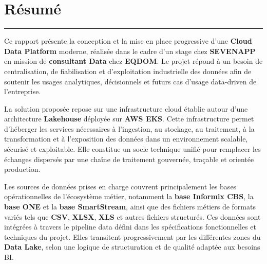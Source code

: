 \chapter*{Résumé}

\begin{center}
{\color{softline}\rule{0.42\textwidth}{0.7pt}}
\end{center}

\vspace{0.18cm}



\begingroup
\enlargethispage{2\baselineskip}
\small
\setlength{\parindent}{0pt}
\setlength{\parskip}{0.42em}
\linespread{1.0}\selectfont
Ce rapport présente la conception et la mise en place progressive d'une \textbf{Cloud Data Platform} moderne, réalisée dans le cadre d'un stage chez \textbf{SEVENAPP} en mission de \textbf{consultant Data} chez \textbf{EQDOM}. Le projet répond à un besoin de centralisation, de fiabilisation et d'exploitation industrielle des données afin de soutenir les usages analytiques, décisionnels et futurs cas d'usage data-driven de l'entreprise.

La solution proposée repose sur une infrastructure cloud établie autour d'une architecture \textbf{Lakehouse} déployée sur \textbf{AWS EKS}. Cette infrastructure permet d'héberger les services nécessaires à l'ingestion, au stockage, au traitement, à la transformation et à l'exposition des données dans un environnement scalable, sécurisé et exploitable. Elle constitue un socle technique unifié pour remplacer les échanges dispersés par une chaîne de traitement gouvernée, traçable et orientée production.

Les sources de données prises en charge couvrent principalement les bases opérationnelles de l'écosystème métier, notamment la \textbf{base Informix CBS}, la \textbf{base ONE} et la \textbf{base SmartStream}, ainsi que des fichiers métiers de formats variés tels que \textbf{CSV}, \textbf{XLSX}, \textbf{XLS} et autres fichiers structurés. Ces données sont intégrées à travers le pipeline data défini dans les spécifications fonctionnelles et techniques du projet. Elles transitent progressivement par les différentes zones du \textbf{Data Lake}, selon une logique de structuration et de qualité adaptée aux besoins BI.

